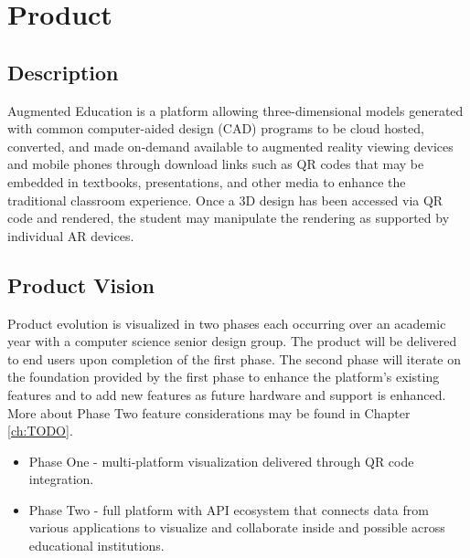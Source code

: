 \section{Product}


\subsection{Description}
Augmented Education is a platform allowing three-dimensional models generated with common computer-aided design (CAD) programs to be cloud hosted, converted, and made on-demand available to augmented reality viewing devices and mobile phones through download links such as QR codes that may be embedded in textbooks, presentations, and other media to enhance the traditional classroom experience. Once a 3D design has been accessed via QR code and rendered, the student may manipulate the rendering as supported by individual AR devices. 

\subsection{Product Vision}
Product evolution is visualized in two phases each occurring over an academic year with a computer science senior design group. The product will be delivered to end users upon completion of the first phase. The second phase will iterate on the foundation provided by the first phase to enhance the platform's existing features and to add new features as future hardware and support is enhanced. More about Phase Two feature considerations may be found in Chapter \ref{ch:TODO}.

\begin{itemize}
\item Phase One - multi-platform visualization delivered through QR code integration.
\item Phase Two - full platform with API ecosystem that connects data from various applications to visualize and collaborate inside and possible across educational institutions. 
\end{itemize}

